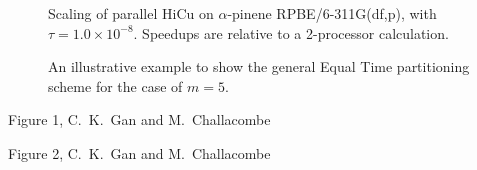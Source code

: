 \commentoutA{\documentclass[prl,aps,twocolumn,showpacs,twocolumngrid,superbib]{revtex4}}
\begin{document}
{\begin{figure}
\caption{Scaling of parallel HiCu on $\alpha$-pinene RPBE/6-311G(df,p), with
$\tau = 1.0 \times 10^{-8}$. Speedups are relative to a 2-processor
calculation.}\label{fig:pinenescaling}
\end{figure}

\begin{figure}
\caption{An illustrative example to show the general Equal Time 
partitioning scheme for the case of $m=5$.}\label{fig:binary}
\end{figure}

\pagebreak
\clearpage

\begin{center}
Figure 1, C.~K.~Gan and M.~Challacombe \\[1.cm]
\end{center}

\clearpage

\begin{center}
Figure 2, C.~K.~Gan and M.~Challacombe \\[1.cm]
\end{center}

}
\end{document}
